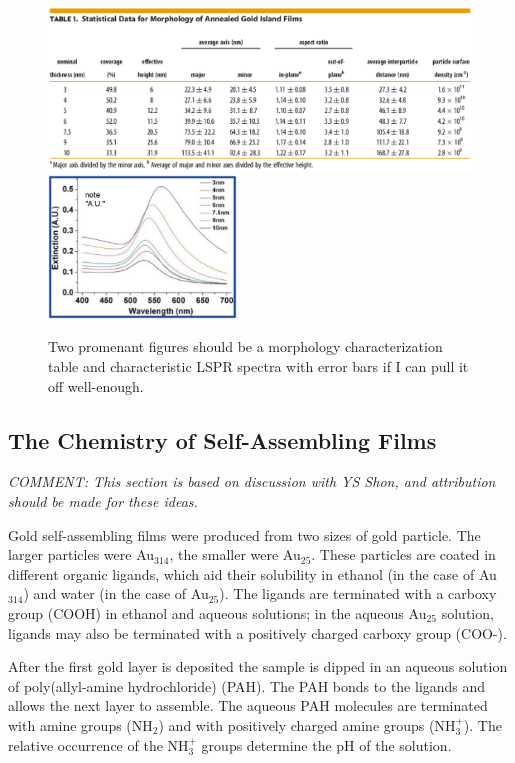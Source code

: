 \documentclass[12pt,oneside,english]{article}
\begin{document}
	\begin{figure}
		\includegraphics[width=120mm]{images/2011_Kedem_morphology.eps}
		\includegraphics[width=50mm]{images/2011_Kedem_spectroscopy.eps}
		\caption{Two promenant figures should be a morphology characterization table and characteristic LSPR spectra with error bars if I can pull it off well-enough.}
	\end{figure}


	\subsection{The Chemistry of Self-Assembling Films}

	\emph{COMMENT: This section is based on discussion with YS Shon, and attribution should be made for these ideas.}
	
	Gold self-assembling films were produced from two sizes of gold particle.  
	The larger particles were Au$_{314}$, the smaller were Au$_{25}$.  
	These particles are coated in different organic ligands, which aid their solubility in ethanol (in the case of Au$_{314}$) and water (in the case of Au$_{25}$).    
	The ligands are terminated with a carboxy group (COOH) in ethanol and aqueous solutions; in the aqueous Au$_{25}$ solution, ligands may also be terminated with a positively charged carboxy group (COO-). 
	
	After the first gold layer is deposited the sample is dipped in an aqueous solution of poly(allyl-amine hydrochloride) (PAH).  
	The PAH bonds to the ligands and allows the next layer to assemble.  	
	The aqueous PAH molecules are terminated with amine groups (NH$_2$) and with positively charged amine groups (NH$_3^+$).  
	The relative occurrence of the NH$_3^+$ groups determine the pH of the solution.
	
\end{document}
